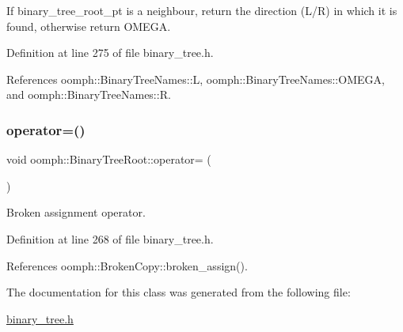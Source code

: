 If binary\+\_\+tree\+\_\+root\+\_\+pt is a neighbour, return the direction (L/R) in which it is found, otherwise return O\+M\+E\+GA. 



Definition at line 275 of file binary\+\_\+tree.\+h.



References oomph\+::\+Binary\+Tree\+Names\+::L, oomph\+::\+Binary\+Tree\+Names\+::\+O\+M\+E\+GA, and oomph\+::\+Binary\+Tree\+Names\+::R.

\mbox{\label{classoomph_1_1BinaryTreeRoot_a1916638c64e0be6660bad778bf942576}} 
\subsubsection{\texorpdfstring{operator=()}{operator=()}}
{\footnotesize\ttfamily void oomph\+::\+Binary\+Tree\+Root\+::operator= (\begin{DoxyParamCaption}\item[{const \hyperlink{classoomph_1_1BinaryTreeRoot}{Binary\+Tree\+Root} \&}]{ }\end{DoxyParamCaption})\hspace{0.3cm}{\ttfamily [inline]}}



Broken assignment operator. 



Definition at line 268 of file binary\+\_\+tree.\+h.



References oomph\+::\+Broken\+Copy\+::broken\+\_\+assign().



The documentation for this class was generated from the following file\+:\begin{DoxyCompactItemize}
\item 
\hyperlink{binary__tree_8h}{binary\+\_\+tree.\+h}\end{DoxyCompactItemize}
